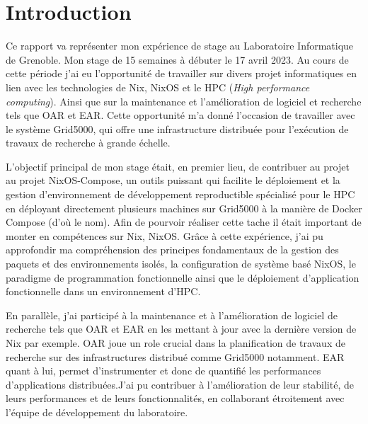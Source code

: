 \documentclass[a4paper,french,12pt, titlepage]{article}
\begin{document}
\newpage

\tableofcontents
\newpage

\hypertarget{introduction}{%
\section{Introduction}\label{introduction}}

Ce rapport va représenter mon expérience de stage au Laboratoire
Informatique de Grenoble. Mon stage de 15 semaines à débuter le 17 avril
2023. Au cours de cette période j'ai eu l'opportunité de travailler sur
divers projet informatiques en lien avec les technologies de Nix, NixOS
et le HPC (\emph{High performance computing}). Ainsi que sur la
maintenance et l'amélioration de logiciel et recherche tels que OAR et
EAR. Cette opportunité m'a donné l'occasion de travailler avec le
système Grid5000, qui offre une infrastructure distribuée pour
l'exécution de travaux de recherche à grande échelle.\newline

L'objectif principal de mon stage était, en premier lieu, de contribuer
au projet au projet NixOS-Compose, un outils puissant qui facilite le
déploiement et la gestion d'environnement de développement reproductible
spécialisé pour le HPC en déployant directement plusieurs machines sur
Grid5000 à la manière de Docker Compose (d'où le nom). Afin de pourvoir
réaliser cette tache il était important de monter en compétences sur
Nix, NixOS. Grâce à cette expérience, j'ai pu approfondir ma
compréhension des principes fondamentaux de la gestion des paquets et
des environnements isolés, la configuration de système basé NixOS, le
paradigme de programmation fonctionnelle ainsi que le déploiement
d'application fonctionnelle dans un environnement d'HPC.\newline

En parallèle, j'ai participé à la maintenance et à l'amélioration de
logiciel de recherche tels que OAR et EAR en les mettant à jour avec la
dernière version de Nix par exemple. OAR joue un role crucial dans la
planification de travaux de recherche sur des infrastructures distribué
comme Grid5000 notamment. EAR quant à lui, permet d'instrumenter et donc
de quantifié les performances d'applications distribuées.J'ai pu
contribuer à l'amélioration de leur stabilité, de leurs performances et
de leurs fonctionnalités, en collaborant étroitement avec l'équipe de
développement du laboratoire.\newline
\end{document}
